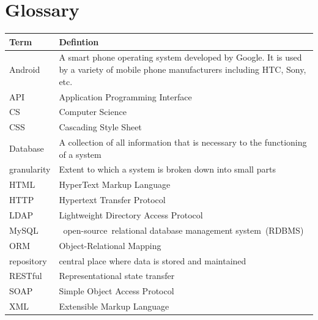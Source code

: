 \documentclass[12pt]{article}
\begin{document}
	\section{Glossary}
		\begin{tabular}{|p{2.1in}|p{4.5in}|} \hline 
			Term & Defintion \\ \hline 
			Android & A smart phone operating system developed by Google. It is used by a variety of mobile phone manufacturers including HTC, Sony, etc. \newline  \\ \hline 
			API & Application Programming Interface \\ \hline 
			CS & Computer Science \\ \hline 
			CSS & Cascading Style Sheet \\ \hline 
			Database & A collection of all information that is necessary to the functioning of a system \\ \hline 
			granularity & Extent to which a system is broken down into small parts \\ \hline 
			HTML & HyperText Markup Language \\ \hline 
			HTTP & Hypertext Transfer Protocol \\ \hline 
			LDAP & Lightweight Directory Access Protocol \newline  \\ \hline 
			MySQL & ~open-source~relational database management system~(RDBMS) \\ \hline 
			ORM & Object-Relational Mapping \\ \hline 
			repository & central place where data is stored and maintained \\ \hline 
			RESTful & Representational state transfer \\ \hline 
			SOAP & Simple Object Access Protocol \newline  \\ \hline 
			XML & Extensible Markup Language \\ \hline 
		\end{tabular}

		\vspace{0.2in}
		
			
	
	
\end{document}
